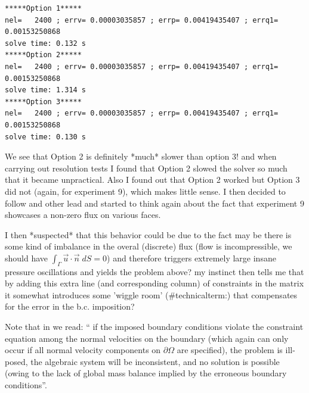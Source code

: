 {\small
\begin{verbatim}
*****Option 1*****
nel=   2400 ; errv= 0.00003035857 ; errp= 0.00419435407 ; errq1= 0.00153250868 
solve time: 0.132 s
*****Option 2*****
nel=   2400 ; errv= 0.00003035857 ; errp= 0.00419435407 ; errq1= 0.00153250868 
solve time: 1.314 s
*****Option 3*****
nel=   2400 ; errv= 0.00003035857 ; errp= 0.00419435407 ; errq1= 0.00153250868 
solve time: 0.130 s
\end{verbatim}
}

We see that Option 2 is definitely *much* slower than option 3!
and when carrying out resolution tests I found that Option 2 slowed 
the solver so much that it became unpractical. 
Also I found out that Option 2 worked but Option 3 did not (again, for experiment 9), which makes little sense. 
I then decided to follow and other lead and started to think again about the fact that 
experiment 9 showcases a non-zero flux on various faces. 

I then *suspected* that this behavior could be due to the fact 
may be there is some kind of imbalance in the overal (discrete)
flux (flow is incompressible, we should have $\int_\Gamma \vec{u}\cdot\vec{n} \; dS=0$) 
and therefore triggers extremely large insane pressure oscillations and 
yields the problem above? my instinct then tells me that 
by adding this extra line (and corresponding column) of constraints in the matrix it somewhat 
introduces some 'wiggle room' (\#technicalterm:) that compensates for the error in the b.c. imposition?

Note that in \textcite{sagl81a} we read:
`` if the imposed boundary conditions violate the constraint equation among the
normal velocities on the boundary (which again can only occur if all normal velocity
components on $\partial\Omega$ are specified), the problem is ill-posed, the algebraic system will be
inconsistent, and no solution is possible (owing to the lack of global mass balance implied by
the erroneous boundary conditions''.

